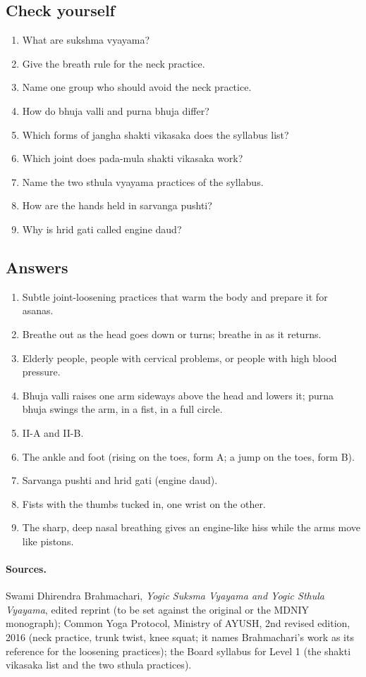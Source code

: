 \subsection*{Check yourself}
\begin{enumerate}
\item What are sukshma vyayama?
\item Give the breath rule for the neck practice.
\item Name one group who should avoid the neck practice.
\item How do bhuja valli and purna bhuja differ?
\item Which forms of jangha shakti vikasaka does the syllabus list?
\item Which joint does pada-mula shakti vikasaka work?
\item Name the two sthula vyayama practices of the syllabus.
\item How are the hands held in sarvanga pushti?
\item Why is hrid gati called engine daud?
\end{enumerate}

\subsection*{Answers}
\begin{enumerate}
\item Subtle joint-loosening practices that warm the body and prepare it for asanas.
\item Breathe out as the head goes down or turns; breathe in as it returns.
\item Elderly people, people with cervical problems, or people with high blood pressure.
\item Bhuja valli raises one arm sideways above the head and lowers it; purna bhuja swings the arm, in a fist, in a full circle.
\item II-A and II-B.
\item The ankle and foot (rising on the toes, form A; a jump on the toes, form B).
\item Sarvanga pushti and hrid gati (engine daud).
\item Fists with the thumbs tucked in, one wrist on the other.
\item The sharp, deep nasal breathing gives an engine-like hiss while the arms move like pistons.
\end{enumerate}

\paragraph{Sources.} Swami Dhirendra Brahmachari, \emph{Yogic Suksma Vyayama and Yogic Sthula Vyayama}, edited reprint (to be set against the original or the MDNIY monograph); Common Yoga Protocol, Ministry of AYUSH, 2nd revised edition, 2016 (neck practice, trunk twist, knee squat; it names Brahmachari's work as its reference for the loosening practices); the Board syllabus for Level 1 (the shakti vikasaka list and the two sthula practices).
